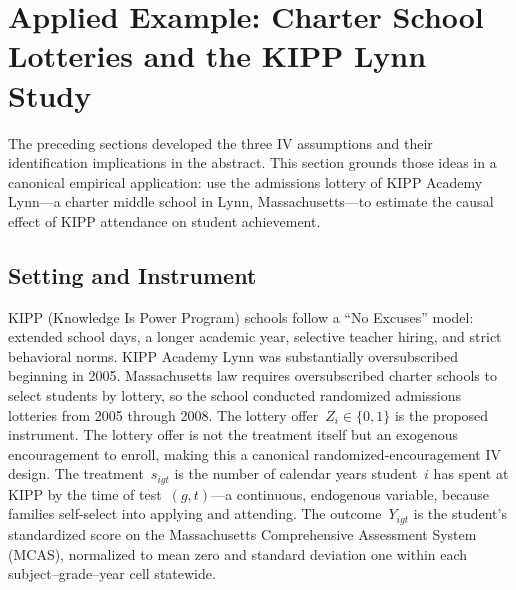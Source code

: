 \documentclass[master.tex]{subfiles}
\begin{document}
\section{Applied Example: Charter School Lotteries and the KIPP Lynn Study}
\label{w7:sec:kipp}

The preceding sections developed the three IV assumptions and their
identification implications in the abstract.  This section grounds
those ideas in a canonical empirical application:
\citet{angrist2012benefits} use the admissions lottery of KIPP Academy
Lynn---a charter middle school in Lynn, Massachusetts---to estimate the
causal effect of KIPP attendance on student achievement.

\subsection{Setting and Instrument}

KIPP (Knowledge Is Power Program) schools follow a ``No Excuses''
model: extended school days, a longer academic year, selective teacher
hiring, and strict behavioral norms.  KIPP Academy Lynn was
substantially oversubscribed beginning in 2005.  Massachusetts law
requires oversubscribed charter schools to select students by lottery,
so the school conducted randomized admissions lotteries from 2005
through 2008.  The lottery offer~$Z_i \in \{0, 1\}$ is the proposed
instrument.  The lottery offer is not the treatment itself but an
exogenous encouragement to enroll, making this a canonical
randomized-encouragement IV design.  The treatment~$s_{igt}$ is the
number of calendar years student~$i$ has spent at KIPP by the time of
test~$(g, t)$---a continuous, endogenous variable, because families
self-select into applying and attending.  The outcome~$Y_{igt}$ is the
student's standardized score on the Massachusetts Comprehensive
Assessment System (MCAS), normalized to mean zero and standard
deviation one within each subject--grade--year cell statewide.
\end{document}
